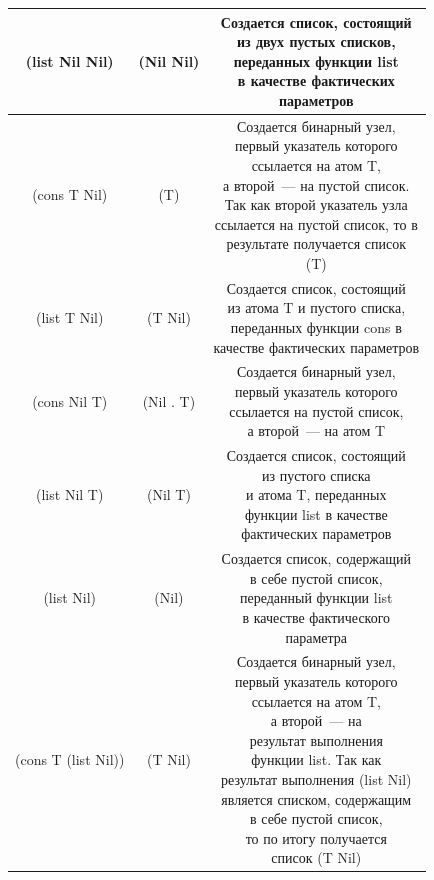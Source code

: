\begin{center}
\begin{longtable}[c]{|c|c|c|}
		\hline
		(list Nil Nil) & (Nil Nil) & \specialcell{Создается список, состоящий\\из двух пустых списков,\\переданных функции list\\в качестве фактических\\параметров}\\
		\hline
		(cons T Nil) & (T) & \specialcell{Создается бинарный узел,\\первый указатель которого\\ссылается на атом T,\\а второй~--- на пустой список.\\Так как второй указатель узла\\ссылается на пустой список, то в\\результате получается список\\(T)}\\
		\hline
		(list T Nil) & (T Nil) & \specialcell{Создается список, состоящий\\из атома T и пустого списка,\\переданных функции cons в\\качестве фактических параметров}\\
		\hline
		(cons Nil T) & (Nil . T) & \specialcell{Создается бинарный узел,\\первый указатель которого\\ссылается на пустой список,\\а второй~--- на атом T}\\
		\hline
		(list Nil T) & (Nil T) & \specialcell{Создается список, состоящий\\из пустого списка\\и атома T, переданных\\функции list в качестве\\фактических параметров}\\
		\hline
		(list Nil) & (Nil) & \specialcell{Создается список, содержащий\\в себе пустой список,\\переданный функции list\\в качестве фактического\\параметра}\\
		\hline
		(cons T (list Nil)) & (T Nil) & \specialcell{Создается бинарный узел,\\первый указатель которого\\ссылается на атом T,\\а второй~--- на\\результат выполнения\\функции list. Так как\\результат выполнения (list Nil)\\является списком, содержащим\\в себе пустой список,\\то по итогу получается\\список (T Nil)}\\

\end{longtable}
\end{center}
